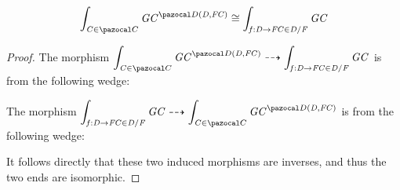 \begin{lemma}\label{adx:coslice-ends-proof}
    \[ \End{\vC \in \mcatC} \Exp{\vG\vC}{\homF\mcatD\vD{\vF\vC}} \iso \End{\vf : \vD \to \vF\vC \in \commaC\vD\vF} \vG\vC \]
\end{lemma}
\begin{proof}
    The morphism $\End{\vC \in \mcatC} \Exp{\vG\vC}{\homF\mcatD\vD{\vF\vC}} \dashrightarrow \End{\vf : \vD \to \vF\vC \in \commaC\vD\vF} \vG\vC$ is from the following wedge:
    \begin{center}
    \end{center}
    The morphism $\End{\vf : \vD \to \vF\vC \in \commaC\vD\vF} \vG\vC \dashrightarrow \End{\vC \in \mcatC} \Exp{\vG\vC}{\homF\mcatD\vD{\vF\vC}} $ is from the following wedge:
    \begin{center}
    \end{center}
    It follows directly that these two induced morphisms are inverses, and thus the two ends are isomorphic.
\end{proof}

